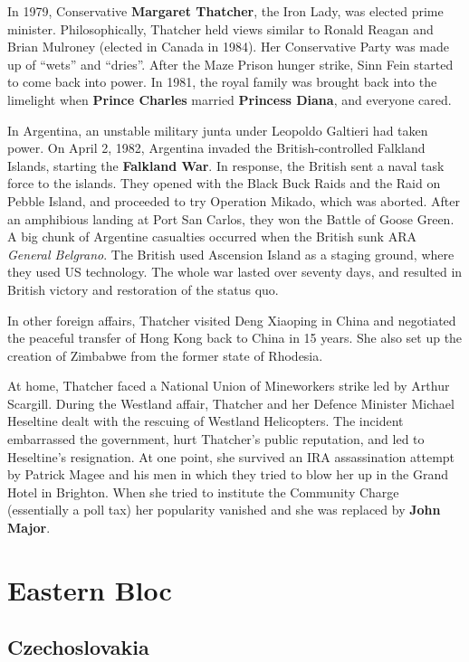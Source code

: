 In 1979, Conservative \textbf{Margaret Thatcher}, the Iron Lady, was elected prime minister.
Philosophically, Thatcher held views similar to Ronald Reagan and Brian Mulroney (elected in Canada in 1984).
Her Conservative Party was made up of ``wets'' and ``dries''.
After the Maze Prison hunger strike, Sinn Fein started to come back into power.
In 1981, the royal family was brought back into the limelight when
\textbf{Prince Charles} married \textbf{Princess Diana}, and everyone cared.

In Argentina, an unstable military junta under Leopoldo Galtieri had taken power.
On April 2, 1982, Argentina invaded the British-controlled Falkland Islands, starting the \textbf{Falkland War}.
In response, the British sent a naval task force to the islands.
They opened with the Black Buck Raids and the Raid on Pebble Island,
and proceeded to try Operation Mikado, which was aborted.
After an amphibious landing at Port San Carlos, they won the Battle of Goose Green.
A big chunk of Argentine casualties occurred when the British sunk ARA \textit{General Belgrano}.
The British used Ascension Island as a staging ground, where they used US technology.
The whole war lasted over seventy days, and resulted in British victory and restoration of the status quo.

In other foreign affairs, Thatcher visited Deng Xiaoping in China
and negotiated the peaceful transfer of Hong Kong back to China in 15 years.
She also set up the creation of Zimbabwe from the former state of Rhodesia.

At home, Thatcher faced a National Union of Mineworkers strike led by Arthur Scargill.
During the Westland affair,
Thatcher and her Defence Minister Michael Heseltine dealt with the rescuing of Westland Helicopters.
The incident embarrassed the government, hurt Thatcher's public reputation, and led to Heseltine's resignation.
At one point, she survived an IRA assassination attempt by Patrick Magee and his men
in which they tried to blow her up in the Grand Hotel in Brighton.
When she tried to institute the Community Charge (essentially a poll tax)
her popularity vanished and she was replaced by \textbf{John Major}.

\section{Eastern Bloc}

\subsection*{Czechoslovakia}


